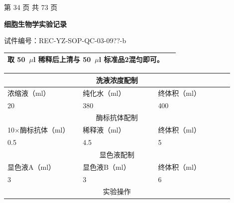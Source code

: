 \documentclass[UTF8,10pt,a4paper,fontset=fandol]{ctexart}
\newcommand{\fieldvalue}[1]{#1}
\newcommand{\handwritten}[1]{#1}
\begin{document}
\begin{center}
第 34 页 共 73 页
\end{center}


\newpage

\begin{center}
\textbf{细胞生物学实验记录}
\end{center}

\noindent
试件编号：REC-YZ-SOP-QC-03-09??-b

\noindent
\begin{tabular}{|p{0.95\linewidth}|}
\hline
取
\fieldvalue{\handwritten{50}}~$\mu$l 稀释后上清与
\fieldvalue{\handwritten{50}}~$\mu$l 标准品2混匀即可。\\
\hline
\end{tabular}

\begin{center}
\begin{tabular}{|p{0.30\linewidth}|p{0.30\linewidth}|p{0.30\linewidth}|}
\hline
\multicolumn{3}{|c|}{洗液浓度配制}\\
\hline
浓缩液（ml） & 纯化水（ml） & 终体积（ml）\\
\hline
\fieldvalue{\handwritten{20}} &
\fieldvalue{\handwritten{380}} &
\fieldvalue{\handwritten{400}}\\
\hline
\multicolumn{3}{|c|}{酶标抗体配制}\\
\hline
10$\times$酶标抗体（ml） & 稀释液（ml） & 终体积（ml）\\
\hline
\fieldvalue{\handwritten{0.5}} &
\fieldvalue{\handwritten{4.5}} &
\fieldvalue{\handwritten{5}}\\
\hline
\multicolumn{3}{|c|}{显色液配制}\\
\hline
显色液A（ml） & 显色液B（ml） & 终体积（ml）\\
\hline
\fieldvalue{\handwritten{3}} &
\fieldvalue{\handwritten{3}} &
\fieldvalue{\handwritten{6}}\\
\hline
\multicolumn{3}{|c|}{实验操作}\\
\hline
\end{tabular}
\end{center}
\end{document}
